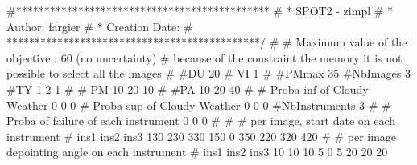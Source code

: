 #*********************************************
# * SPOT2 - zimpl
# * Author: fargier
# * Creation Date:
#  *********************************************/
#
# Maximum value of the objective : 60  (no uncertainty)
# because of the constraint the memory it is not possible to select all the images
#
#DU
20
# VI
1
#
#PMmax 
35 
#NbImages
3 
#TY 
1
2
1
#
# PM
10
20
10
#
#PA
10
20
40
#
# Proba inf of Cloudy Weather
0
0
0
# Proba sup of Cloudy Weather
0
0
0
#NbInstruments
3
#
# Proba of failure of each instrument
0
0
0
#
#
# per image, start date on each instrument
# ins1 ins2 ins3
130 230 330
150 0 350
220 320 420
#
# per image depointing angle on each instrument
# ins1 ins2 ins3
10 10 10
5 0 5
20 20 20


